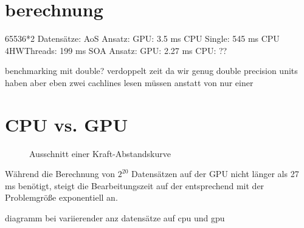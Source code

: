 \section{berechnung}
65536*2 Datensätze:
AoS Ansatz: GPU: 3.5 ms CPU Single: 545 ms CPU 4HWThreads: 199 ms
SOA Ansatz: GPU: 2.27 ms CPU: ??

benchmarking mit double? verdoppelt zeit da wir genug double precision units haben aber eben zwei cachlines lesen müssen anstatt von nur einer

\section{CPU vs. GPU}

\begin{figure}[h!]
\centering
\caption{Ausschnitt einer Kraft-Abstandskurve}
\label{fig:kraftbsp}
\end{figure}

Während die Berechnung von $2^{20}$ Datensätzen auf der GPU nicht länger als 27 ms benötigt, steigt die Bearbeitungszeit auf der entsprechend mit der Problemgröße exponentiell an.

diagramm bei variierender anz datensätze auf cpu und gpu
